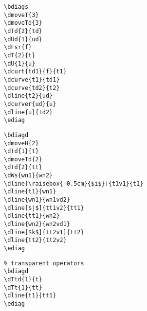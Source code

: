 \documentclass[a4paper]{article}
\begin{document}
 \begin{minipage}[b]{0.5\linewidth}\centering
  \begin{lstlisting}
\bdiags
\dmoveT{3}
\dmoveTd{3}
\dTd{2}{td}
\dUd{1}{ud}
\dFsr{f}
\dT{2}{t}
\dU{1}{u}
\dcurt{td1}{f}{t1}
\dcurve{t1}{td1}
\dcurve{td2}{t2}
\dline{t2}{ud}
\dcurver{ud}{u}
\dline{u}{td2}
\ediag
  \end{lstlisting}
 \end{minipage}
 \begin{minipage}[b]{0.5\linewidth}\centering
\bdiags
{}
\ediag
 \end{minipage}

 \begin{minipage}[b]{0.5\linewidth}\centering
  \begin{lstlisting}
\bdiagd
\dmoveH{2}
\dTd{1}{t}
\dmoveTd{2}
\dTd{2}{tt}
\dWs{wn1}{wn2}
\dline[\raisebox{-0.5cm}{$i$}]{t1v1}{t1}
\dline{t1}{wn1}
\dline{wn1}{wn1vd2}
\dline[$j$]{tt1v2}{tt1}
\dline{tt1}{wn2}
\dline{wn2}{wn2vd1}
\dline[$k$]{tt2v1}{tt2}
\dline{tt2}{tt2v2}
\ediag
\end{lstlisting}
\end{minipage}
 \begin{minipage}[b]{0.5\linewidth}\centering
\bdiagd
{}
\ediag
\end{minipage}

\begin{minipage}[b]{0.5\linewidth}\centering
 \begin{lstlisting}
% transparent operators
\bdiagd
\dTtd{1}{t}
\dTt{1}{tt}
\dline{t1}{tt1}
\ediag
\end{lstlisting}
\end{minipage}
 \begin{minipage}[b]{0.5\linewidth}\centering
\bdiagd
{}
\ediag
\end{minipage}
\end{document}
